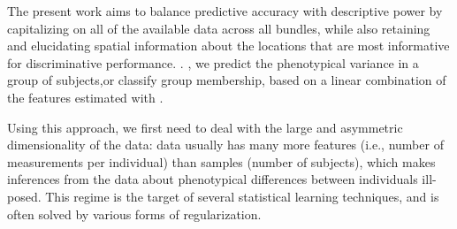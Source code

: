 \documentclass[10pt,letterpaper]{article}
\begin{document}
The present work aims to balance predictive accuracy with descriptive power
\cite{Murdoch2019-ax, Breiman2001-uz} by capitalizing on all of the available
data across all bundles, while also retaining and elucidating spatial
information about the locations that are most informative for discriminative
performance.
.
, we predict the phenotypical variance in a group of subjects,or classify group membership, based on a linear combination of the features estimated with .


Using this approach, we first need to deal with the large and
asymmetric dimensionality of the data: 
data usually has
many more features (i.e., number of measurements per individual) than
samples (number of subjects), which makes inferences from the data
about phenotypical differences between individuals ill-posed. This
regime is the target of several statistical learning techniques, and
is often solved by various forms of regularization.
\end{document}
